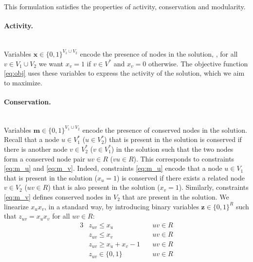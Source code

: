 		This formulation satisfies the properties of activity, conservation and modularity.

		\paragraph{Activity.}\mbox{}\\
		Variables $\mathbf{x} \in \{0, 1\}^{V_1 \cup V_2}$ encode the presence of nodes in the solution, \ie, for all $v \in V_1 \cup V_2$ we want $x_v = 1$ if $v \in V^*$ and $x_v = 0$ otherwise.
		The objective function \eqref{eq:obj} uses these variables to express the activity of the solution, which we aim to maximize.

		\paragraph{Conservation.}\mbox{}\\
		Variables $\mathbf{m} \in \{0, 1\}^{V_1 \cup V_2}$ encode the presence of conserved nodes in the solution.
		Recall that a node $u \in V_1^*$ ($u \in V_2^*$) that is present in the solution is conserved if there is another node $v \in V_2^*$ ($v \in V_1^*$) in the solution such that the two nodes form a conserved node pair $uv \in R$ ($vu \in R$).
		This corresponds to constraints \eqref{eq:m_u} and \eqref{eq:m_v}.
		Indeed, constraints \eqref{eq:m_u} encode that a node $u \in V_1$ that is present in the solution ($x_u = 1$) is conserved if there exists a related node $v \in V_2$ ($uv \in R$) that is also present in the solution ($x_v = 1$).
		Similarly, constraints \eqref{eq:m_v} defines conserved nodes in $V_2$ that are present in the solution.
		We linearize $x_ux_v$, in a standard way, by introducing binary variables $\mathbf{z} \in \{0,1\}^R$ such that $z_{uv} = x_ux_v$ for all $uv \in R$:
		\allowdisplaybreaks
		\begin{alignat}{3}
		\label{eq:z1} & z_{uv} \leq x_u                 & uv \in R\\
		\label{eq:z2} & z_{uv} \leq x_v                 & uv \in R\\
		\label{eq:z3} & z_{uv} \geq x_u + x_v - 1 \quad & uv \in R\\
		\label{eq:vars2} & z_{uv} \in \{0,1\} & uv \in R
		\end{alignat}

